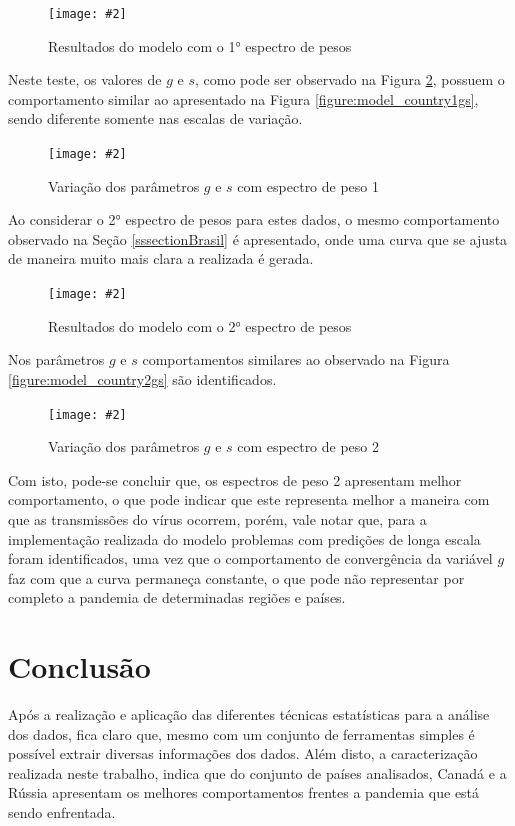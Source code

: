 \documentclass[a4paper,12pt]{article}
\newcommand{\image}[4]{
    \begin{figure}[H]%
        \begin{center}
        \caption{#3}
        \texttt{[image: \#2]}
        \label{#4}
        \end{center}
    \end{figure}
}
\begin{document}
\image{0.85}{images/modelo/regiao/estimativa_MG_1.png}{Resultados do modelo com o 1° espectro de pesos}{figure:model_region1}

\par Neste teste, os valores de $g$ e $s$, como pode ser observado na Figura \ref{figure:model_region1gs}, possuem o comportamento similar ao apresentado na Figura \ref{figure:model_country1gs}, sendo diferente somente nas escalas de variação. 

\image{0.75}{images/modelo/regiao/gs_modelo_MG_1.png}{Variação dos parâmetros $g$ e $s$ com espectro de peso 1}{figure:model_region1gs}

\par Ao considerar o 2° espectro de pesos para estes dados, o mesmo comportamento observado na Seção \ref{sssectionBrasil} é apresentado, onde uma curva que se ajusta de maneira muito mais clara a realizada é gerada. 

\image{0.85}{images/modelo/regiao/estimativa_MG_2.png}{Resultados do modelo com o 2° espectro de pesos}{figure:model_region2}

\par Nos parâmetros $g$ e $s$ comportamentos similares ao observado na Figura \ref{figure:model_country2gs} são identificados.

\image{0.75}{images/modelo/regiao/gs_modelo_MG_2.png}{Variação dos parâmetros $g$ e $s$ com espectro de peso 2}{figure:model_region2gs}

\par Com isto, pode-se concluir que, os espectros de peso 2 apresentam melhor comportamento, o que pode indicar que este representa melhor a maneira com que as transmissões do vírus ocorrem, porém, vale notar que, para a implementação realizada do modelo problemas com predições de longa escala foram identificados, uma vez que o comportamento de convergência da variável $g$ faz com que a curva permaneça constante, o que pode não representar por completo a pandemia de determinadas regiões e países.

\section{Conclusão}

\par Após a realização e aplicação das diferentes técnicas estatísticas para a análise dos dados, fica claro que, mesmo com um conjunto de ferramentas simples é possível extrair diversas informações dos dados. Além disto, a caracterização realizada neste trabalho, indica que do conjunto de países analisados, Canadá e a Rússia apresentam os melhores comportamentos frentes a pandemia que está sendo enfrentada.

% 
% 
\end{document}
